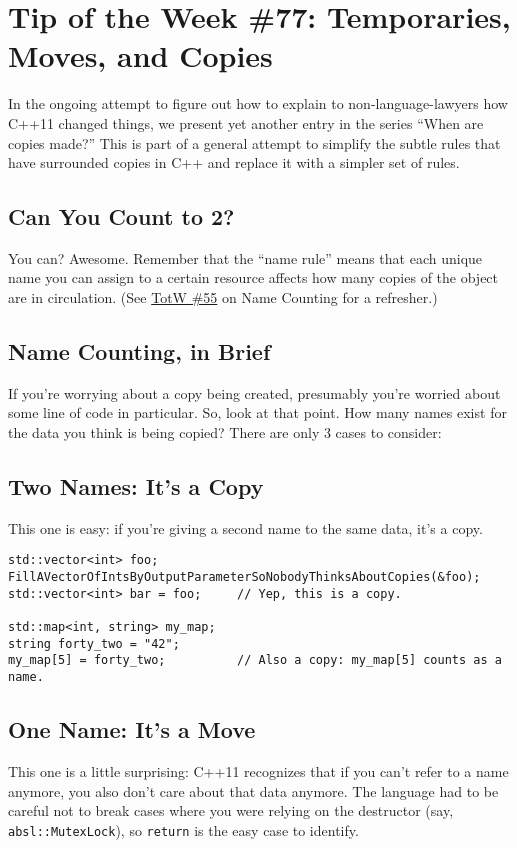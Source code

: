 
\chapter{Tip of the Week \#77: Temporaries, Moves, and Copies}\label{ch:tip-of-the-week-77}

In the ongoing attempt to figure out how to explain to non-language-lawyers how C++11 changed things, we present yet another entry in the series \enquote{When are copies made?} This is part of a general attempt to simplify the subtle rules that have surrounded copies in C++ and replace it with a simpler set of rules.

\section{Can You Count to 2?}
You can? Awesome. Remember that the \enquote{name rule} means that each unique name you can assign to a certain resource affects how many copies of the object are in circulation. (See \hyperref[ch:tip-of-the-week-55]{TotW \#55} on Name Counting for a refresher.)

\section{Name Counting, in Brief}
If you’re worrying about a copy being created, presumably you’re worried about some line of code in particular. So, look at that point. How many names exist for the data you think is being copied? There are only 3 cases to consider:

\section{Two Names: It’s a Copy}
This one is easy: if you’re giving a second name to the same data, it’s a copy.

\begin{verbatim}
std::vector<int> foo;
FillAVectorOfIntsByOutputParameterSoNobodyThinksAboutCopies(&foo);
std::vector<int> bar = foo;     // Yep, this is a copy.

std::map<int, string> my_map;
string forty_two = "42";
my_map[5] = forty_two;          // Also a copy: my_map[5] counts as a name.
\end{verbatim}

\section{One Name: It’s a Move}
This one is a little surprising: C++11 recognizes that if you can’t refer to a name anymore, you also don’t care about that data anymore. The language had to be careful not to break cases where you were relying on the destructor (say, \texttt{absl::MutexLock}), so \texttt{return} is the easy case to identify.

